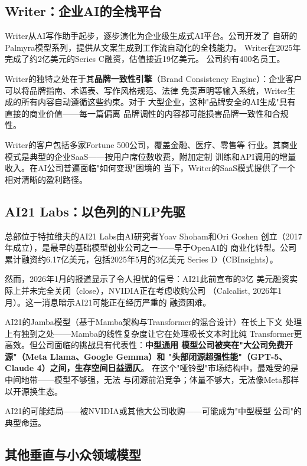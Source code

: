 \subsection{Writer：企业AI的全栈平台}
\label{subsec:writer}

Writer从AI写作助手起步，逐步演化为企业级生成式AI平台。公司开发了
自研的Palmyra模型系列，提供从文案生成到工作流自动化的全栈能力。
Writer在2025年完成了约2亿美元的Series C融资，估值接近19亿美元。
公司约有400名员工。

Writer的独特之处在于其\textbf{品牌一致性引擎}（Brand Consistency
Engine）：企业客户可以将品牌指南、术语表、写作风格规范、法律
免责声明等输入系统，Writer生成的所有内容自动遵循这些约束。对于
大型企业，这种"品牌安全的AI生成"具有直接的商业价值——每一篇偏离
品牌调性的内容都可能损害品牌一致性和合规性。

Writer的客户包括多家Fortune 500公司，覆盖金融、医疗、零售等
行业。其商业模式是典型的企业SaaS——按用户席位数收费，附加定制
训练和API调用的增量收入。在AI公司普遍面临"如何变现"困境的
当下，Writer的SaaS模式提供了一个相对清晰的盈利路径。

\subsection{AI21 Labs：以色列的NLP先驱}
\label{subsec:ai21}

总部位于特拉维夫的AI21 Labs由AI研究者Yoav Shoham和Ori Goshen
创立（2017年成立），是最早的基础模型创业公司之一——早于OpenAI的
商业化转型。公司累计融资约6.17亿美元，包括2025年5月的3亿美元
Series D（CBInsights）。

然而，2026年1月的报道显示了令人担忧的信号：AI21此前宣布的3亿
美元融资实际上并未完全关闭（close），NVIDIA正在考虑收购公司
（Calcalist, 2026年1月）。这一消息暗示AI21可能正在经历严重的
融资困难。

AI21的Jamba模型（基于Mamba架构与Transformer的混合设计）在长上下文
处理上有独到之处——Mamba的线性复杂度让它在处理极长文本时比纯
Transformer更高效。但公司面临的挑战具有代表性：\textbf{中型通用
模型公司被夹在"大公司免费开源"（Meta Llama、Google Gemma）和
"头部闭源超强性能"（GPT-5、Claude 4）之间，生存空间日益逼仄}。
在这个"哑铃型"市场结构中，最难受的是中间地带——模型不够强，无法
与闭源前沿竞争；体量不够大，无法像Meta那样以开源换生态。

AI21的可能结局——被NVIDIA或其他大公司收购——可能成为"中型模型
公司"的典型命运。

\subsection{其他垂直与小众领域模型}
\label{subsec:other-vertical}

